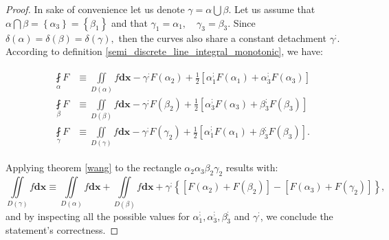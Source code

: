 \documentclass[11pt]{book}
\begin{document}
\begin{proof}In sake of convenience let us denote $\gamma=\alpha\bigcup\beta.$ Let us assume that $\alpha\bigcap\beta=\left\{\alpha_3\right\}=\left\{\beta_1\right\}$ and that $\gamma_1=\alpha_1,\quad\gamma_3=\beta_3.$ Since $\delta\left(\alpha\right)=\delta\left(\beta\right)=\delta\left(\gamma\right),$ then the curves also share a constant detachment $\gamma^;$. According to definition \ref{semi_discrete_line_integral_monotonic}, we have:

\begin{align}
&\begin{aligned}
\underset{\alpha}{\fint}F & \equiv\underset{D\left(\alpha\right)}{\iint}f\boldsymbol{dx}-\gamma^{;}F\left(\alpha_{2}\right)+\frac{1}{2}\left[\alpha_{1}^{;}F\left(\alpha_{1}\right)+\alpha_{3}^{;}F\left(\alpha_{3}\right)\right]\\
\underset{\beta}{\fint}F & \equiv\underset{D\left(\beta\right)}{\iint}f\boldsymbol{dx}-\gamma^{;}F\left(\beta_{2}\right)+\frac{1}{2}\left[\alpha_{3}^{;}F\left(\alpha_{3}\right)+\beta_{3}^{;}F\left(\beta_{3}\right)\right]\\
\underset{\gamma}{\fint}F & \equiv\underset{D\left(\gamma\right)}{\iint}f\boldsymbol{dx}-\gamma^{;}F\left(\gamma_{2}\right)+\frac{1}{2}\left[\alpha_{1}^{;}F\left(\alpha_{1}\right)+\beta_{3}^{;}F\left(\beta_{3}\right)\right].
\end{aligned}
\end{align}

Applying theorem \ref{wang} to the rectangle $\alpha_2\alpha_3\beta_2\gamma_2$ results with:
$$\underset{D\left(\gamma\right)}{\iint}f\boldsymbol{dx}  \equiv\underset{D\left(\alpha\right)}{\iint}f\boldsymbol{dx}+\underset{D\left(\beta\right)}{\iint}f\boldsymbol{dx}+\gamma^{;}\left\{ \left[F\left(\alpha_{2}\right)+F\left(\beta_{2}\right)\right]-\left[F\left(\alpha_{3}\right)+F\left(\gamma_{2}\right)\right]\right\} ,$$
and by inspecting all the possible values for $\alpha_1^;,\alpha_3^;,\beta_3^;$ and $\gamma^;$, we conclude the statement's correctness.
\end{proof}
\end{document}
